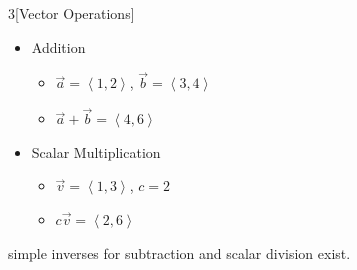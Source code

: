 \documentclass[11pt]{article}
\theoremstyle{definition}
\newcommand{\col}[1]{\begin{minipage}{\columnwidth}#1\end{minipage}}
\begin{document}
\newpage
\begin{multicols}{3}[Vector Operations]
  \col{
    \begin{itemize}
      \item Addition
      \begin{itemize}
        \item $\vec{a} = \left< 1,2 \right>$,  $\vec{b} = \left< 3,4 \right>$
        \item $\vec{a} + \vec{b} = \left< 4,6 \right>$
      \end{itemize}
    \end{itemize}
  }
  \col{
    \begin{itemize}
      \item Scalar Multiplication
      \begin{itemize}
        \item $\vec{v} = \left< 1,3 \right>$, $c = 2$
        \item $c\vec{v} = \left< 2,6 \right>$
      \end{itemize}
    \end{itemize}
  }
  \col{
    simple inverses for subtraction and scalar division exist.
  }
\end{multicols}
\end{document}
